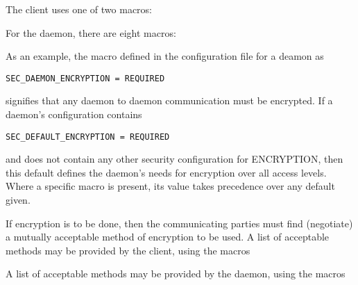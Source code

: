 The client uses one of two macros:
\begin{description}
\item{}
\item{}
\end{description}

For the daemon, there are eight macros:
\begin{description}
\item{}
\item{}
\item{}
\item{}
\item{}
\item{}
\item{}
\item{}
\end{description}

As an example, the macro defined in the configuration file
for a deamon as
\begin{verbatim}
SEC_DAEMON_ENCRYPTION = REQUIRED
\end{verbatim}
signifies that any daemon to daemon communication must be
encrypted.
If a daemon's configuration contains
\begin{verbatim}
SEC_DEFAULT_ENCRYPTION = REQUIRED
\end{verbatim}
and does not contain any other security configuration for
ENCRYPTION, then this default defines the daemon's needs
for encryption over all access levels.
Where a specific macro is present, its value takes
precedence over any default given.

If encryption is to be done, then the communicating parties
must find (negotiate) a mutually acceptable method of
encryption to be used.
A list of acceptable methods may be provided by the client, using the
macros
\begin{description}
\item{}
\item{}
\end{description}
A list of acceptable methods may be provided by the daemon, using the
macros
\begin{description}
\item{}
\item{}
\item{}
\item{}
\item{}
\item{}
\item{}
\item{}
\end{description}

